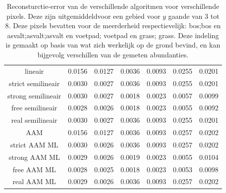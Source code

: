 \documentclass[12pt]{report}
\begin{document}
\begin{table}
\centering
\begin{tabular}{|c|c|c|c|c|c|c|}
\hline
 &  &  &  &  &  &  \\
\hline
lineair  & 0.0156 & 0.0127 & 0.0036 & 0.0093 & 0.0255 & 0.0201 \\
\hline
strict semilineair  & 0.0030 & 0.0027 & 0.0036 & 0.0093 & 0.0255 & 0.0201 \\
\hline
strong semilineair  & 0.0030 & 0.0027 & 0.0018 & 0.0023 & 0.0057 & 0.0099 \\
\hline
free semilineair  & 0.0028 & 0.0026 & 0.0018 & 0.0023 & 0.0055 & 0.0092 \\
\hline
real semilineair  & 0.0030 & 0.0027 & 0.0036 & 0.0093 & 0.0255 & 0.0201 \\
\hline
AAM  & 0.0156 & 0.0127 & 0.0036 & 0.0093 & 0.0257 & 0.0202 \\
\hline
strict AAM ML  & 0.0030 & 0.0026 & 0.0036 & 0.0093 & 0.0257 & 0.0202 \\
\hline
strong AAM ML  & 0.0029 & 0.0026 & 0.0019 & 0.0023 & 0.0055 & 0.0104 \\
\hline
free AAM ML  & 0.0028 & 0.0025 & 0.0018 & 0.0023 & 0.0053 & 0.0098 \\
\hline
real AAM ML  & 0.0029 & 0.0026 & 0.0036 & 0.0093 & 0.0257 & 0.0202 \\
\hline
\end{tabular}
\caption{Reconsturctie-error van de verschillende algoritmen voor verschillende pixels. Deze zijn uitgemiddeldvoor een gebied voor $y$ gaande van 3 tot 8. Deze pixels bevatten voor de meerderheid respectievelijk: bos;bos en asvalt;asvalt;asvalt en voetpad; voetpad en grass; grass. Deze indeling is gemaakt op basis van wat zich werkelijk op de grond bevind, en kan bijgevolg verschillen van de gemeten abundanties.
\label{table:Merrors}}
\end{table}
\end{document}
